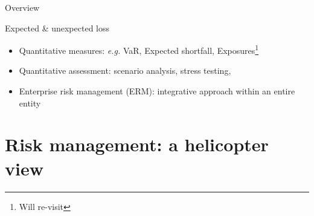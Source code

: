 \documentclass[10pt]{beamer}
\begin{document}
\begin{frame}[allowframebreaks]{Overview}
\begin{block}{Expected \& unexpected loss}
	\begin{itemize}
		\item Quantitative measures: \textit{e.g.} VaR, Expected shortfall, Exposures\footnote{Will re-visit}  
		\item Quantitative assessment: scenario analysis, stress testing, 
		\item Enterprise risk management (ERM): integrative approach within an entire entity
	\end{itemize}
\end{block}

\end{frame}



\section{Risk management: a helicopter view}
\end{document}
